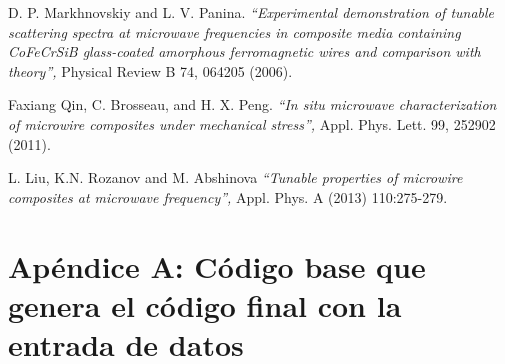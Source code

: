 \documentclass[12pt,letterpaper]{article}
\numberwithin{equation}{section}
\begin{document}
\begin{thebibliography}{9}
	D. P. Markhnovskiy and L. V. Panina.
	\textit{``Experimental demonstration of tunable scattering spectra at microwave frequencies in composite media containing CoFeCrSiB glass-coated amorphous ferromagnetic wires and comparison with theory'',} 
	Physical Review B 74, 064205 (2006).	
	
	Faxiang Qin, C. Brosseau, and H. X. Peng.
	\textit{``In situ microwave characterization of microwire composites under mechanical stress'',} 
	Appl. Phys. Lett. 99, 252902 (2011).
	
	L. Liu, K.N. Rozanov and M. Abshinova
	\textit{``Tunable properties of microwire composites at microwave frequency'',} 
	Appl. Phys. A (2013) 110:275-279.		
	
	\end{thebibliography}


\pagebreak

\part*{Apéndice A: Código base que genera el código final con la entrada de datos}
\end{document}
